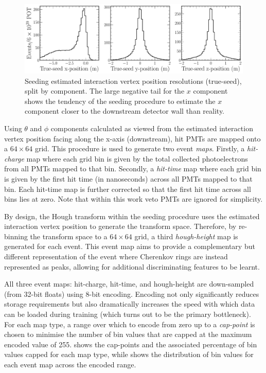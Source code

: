 \begin{figure} %
    \includegraphics[width=\textwidth]{diagrams/7-results/explore_true_reco_vtx.pdf}
    \caption[Seeding estimated interaction vertex position resolutions]
    {Seeding estimated interaction vertex position resolutions (true-seed), split by component.
        The large negative tail for the $x$ component shows the tendency of the seeding procedure
        to estimate the $x$ component closer to the downstream detector wall than reality.}
    \label{fig:explore_true_reco_vtx}
\end{figure}

Using $\theta$ and $\phi$ components calculated as viewed from the estimated interaction vertex
position facing along the x-axis (downstream), hit PMTs are mapped onto a $64 \times 64$ grid.
This procedure is used to generate two event \emph{maps}. Firstly, a \emph{hit-charge} map where
each grid bin is given by the total collected photoelectrons from all PMTs mapped to that bin.
Secondly, a \emph{hit-time} map where each grid bin is given by the first hit time (in
nanoseconds) across all PMTs mapped to that bin. Each hit-time map is further corrected so that
the first hit time across all bins lies at zero. Note that within this work veto PMTs are ignored
for simplicity.

By design, the Hough transform within the seeding procedure uses the estimated interaction vertex
position to generate the transform space. Therefore, by re-binning the transform space to a $64
\times 64$ grid, a third \emph{hough-height} map is generated for each event. This event map aims
to provide a complementary but different representation of the event where Cherenkov rings are
instead represented as peaks, allowing for additional discriminating features to be learnt.

All three event maps: hit-charge, hit-time, and hough-height are down-sampled (from 32-bit floats)
using 8-bit encoding. Encoding not only significantly reduces storage requirements but also
dramatically increases the speed with which data can be loaded during training (which turns out to
be the primary bottleneck). For each map type, a range over which to encode from zero up to a
\emph{cap-point} is chosen to minimise the number of bin values that are capped at the maximum
encoded value of 255.  shows the cap-points and the associated percentage
of bin values capped for each map type, while  shows the
distribution of bin values for each event map across the encoded range.

